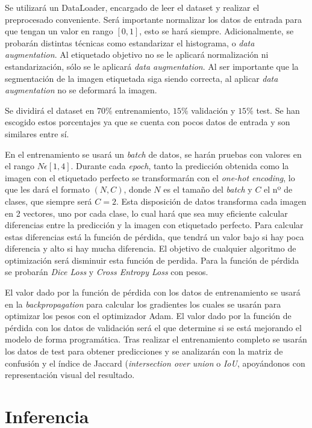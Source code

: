 Se utilizará un DataLoader, encargado de leer el dataset y realizar el preprocesado conveniente. Será importante normalizar los datos de entrada para que tengan un valor en rango $ [0, 1] $, esto se hará siempre. Adicionalmente, se probarán distintas técnicas como estandarizar el histograma, o \textit{data augmentation}. Al etiquetado objetivo no se le aplicará normalización ni estandarización, sólo se le aplicará \textit{data augmentation}. Al ser importante que la segmentación de la imagen etiquetada siga siendo correcta, al aplicar \textit{data augmentation} no se deformará la imagen.

Se dividirá el dataset en $ 70\% $ entrenamiento, $ 15\% $ validación y $ 15\% $ test. Se han escogido estos porcentajes ya que se cuenta con pocos datos de entrada y son similares entre sí.

En el entrenamiento se usará un \textit{batch} de datos, se harán pruebas con valores en el rango $N\epsilon[1,4]$. Durante cada \textit{epoch}, tanto la predicción obtenida como la imagen con el etiquetado perfecto se transformarán con el \textit{one-hot encoding}, lo que les dará el formato $(N, C)$, donde $N$ es el tamaño del \textit{batch} y $C$ el nº de clases, que siempre será $C=2$. Esta disposición de datos transforma cada imagen en 2 vectores, uno por cada clase, lo cual hará que sea muy eficiente calcular diferencias entre la predicción y la imagen con etiquetado perfecto. Para calcular estas diferencias está la función de pérdida, que tendrá un valor bajo si hay poca diferencia y alto si hay mucha diferencia. El objetivo de cualquier algoritmo de optimización será disminuir esta función de perdida. Para la función de pérdida se probarán \textit{Dice Loss} y \textit{Cross Entropy Loss} con pesos. 

El valor dado por la función de pérdida con los datos de entrenamiento se usará en la \textit{backpropagation} para calcular los gradientes los cuales se usarán para optimizar los pesos con el optimizador Adam. El valor dado por la función de pérdida con los datos de validación será el que determine si se está mejorando el modelo de forma programática. Tras realizar el entrenamiento completo  se usarán los datos de test para obtener predicciones y se analizarán con la matriz de confusión y el índice de Jaccard (\textit{intersection over union} o \textit{IoU}, apoyándonos con representación visual del resultado.

\pagebreak \section{Inferencia}\label{sec:inferencia}

